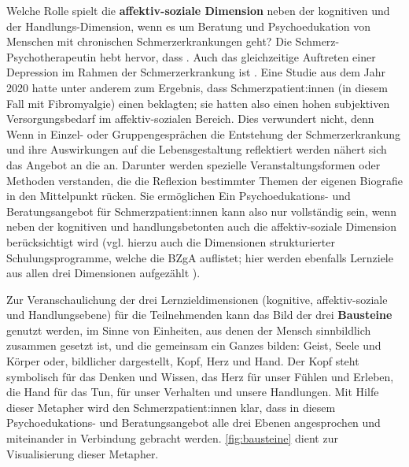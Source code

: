 \documentclass[
  twoside,
  parskip=half-,
  paper=176mm:246mm,
  BCOR=14mm,
  DIV=14,
]{scrreprt}
\begin{document}
\begin{praxis}
Welche Rolle spielt die \textbf{affektiv-soziale Dimension} neben der kognitiven und der Handlungs-Dimension, wenn es um Beratung und Psychoedukation von Menschen mit chronischen Schmerzerkrankungen geht? Die Schmerz-Psychotherapeutin \citeauthor{glier} hebt hervor, dass . Auch das gleichzeitige Auftreten einer Depression im Rahmen der Schmerzerkrankung ist . Eine Studie aus dem Jahr 2020 hatte unter anderem zum Ergebnis, dass Schmerzpatient:innen (in diesem Fall mit Fibromyalgie) einen  beklagten; sie hatten also einen hohen subjektiven Versorgungsbedarf im affektiv-sozialen Bereich. Dies verwundert nicht, denn  Wenn in Einzel- oder Gruppengesprächen die Entstehung der Schmerzerkrankung und ihre Auswirkungen auf die Lebensgestaltung reflektiert werden nähert sich das Angebot an die  an. Darunter werden spezielle Veranstaltungsformen oder Methoden verstanden, die die Reflexion bestimmter Themen der eigenen Biografie in den Mittelpunkt rücken. Sie ermöglichen  Ein Psychoedukations- und Beratungsangebot für Schmerzpatient:innen kann also nur vollständig sein, wenn neben der kognitiven und handlungsbetonten auch die affektiv-soziale Dimension berücksichtigt wird (vgl. hierzu auch die Dimensionen strukturierter Schulungsprogramme, welche die BZgA auflistet; hier werden ebenfalls Lernziele aus allen drei Dimensionen aufgezählt \autocite[vgl.][]{BZGABeratungEdukation}). 

Zur Veranschaulichung der drei Lernzieldimensionen (kognitive, affektiv-soziale und Handlungsebene) für die Teilnehmenden kann das Bild der drei \textbf{Bausteine} genutzt werden, im Sinne von Einheiten, aus denen der Mensch sinnbildlich zusammen gesetzt ist, und die gemeinsam ein Ganzes bilden: Geist, Seele und Körper oder, bildlicher dargestellt, Kopf, Herz und Hand. Der Kopf steht symbolisch für das Denken und Wissen, das Herz für unser Fühlen und Erleben, die Hand für das Tun, für unser Verhalten und unsere Handlungen. Mit Hilfe dieser Metapher wird den Schmerzpatient:innen klar, dass in diesem Psychoedukations- und Beratungsangebot alle drei Ebenen angesprochen und miteinander in Verbindung gebracht werden. \autoref{fig:bausteine} dient zur Visualisierung dieser Metapher.
 \end{praxis}
 
\end{document}
